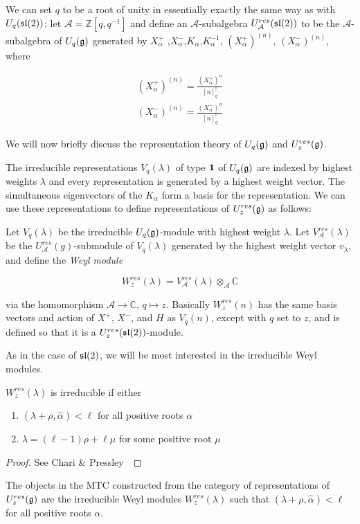 We can set $q$ to be a root of unity in essentially exactly the same way as
with $U_q(\mathfrak{sl}(2))$: let $\mathcal{A} = \mathbb{Z}[q,q^{-1}]$ and define an 
$\mathcal{A}$-subalgebra $U_\mathcal{A}^{res}(\mathfrak{sl}(2))$ to be the
$\mathcal{A}$-subalgebra of $U_q(\mathfrak{g})$ generated by $ X_\alpha^+$
,$X_\alpha^-$,$K_\alpha$,$K_\alpha^{-1}$, $(X_\alpha^+) ^{(n)}$,
$(X_\alpha^-)^{(n)}$, where


\begin{align}
     (X_\alpha^+)^{(n)} = \frac{ (X_\alpha^+)^n}{[n]^!_{q}} \\
    (X_\alpha^-)^{(n)} = \frac{(X_\alpha^-)^n}{[n]^!_{q}} 
\end{align}


We will now briefly discuss the representation theory of $U_q(\mathfrak{g})$ and $U_z^{res}(\mathfrak{g})$.

The irreducible representations $V_q(\lambda)$ of type $\mathbf{1}$ of
$U_q(\mathfrak{g})$ are indexed by highest weights $\lambda$ and every representation
is generated by a highest weight vector. The simultaneous eigenvectors of the
$K_\alpha$ form a basis for the representation. We can use these
representations to define representations of $U_z^{res}(\mathfrak{g})$ as follows:

Let $V_q(\lambda)$ be the irreducible $U_q(\mathfrak{g})$-module with highest weight
$\lambda$. Let $V_\mathcal{A}^{res}(\lambda)$ be the
$U_\mathcal{A}^{res}(g)$-submodule of $V_q(\lambda)$ generated by the highest
weight vector $v_\lambda$, and define the \emph{Weyl module}

\begin{equation}
    W_z^{res}(\lambda) = V_\mathcal{A}^{res}(\lambda) \otimes_\mathcal{A} \mathbb{C}
\end{equation}

via the homomorphism $\mathcal{A} \to \mathbb{C}$, $q \mapsto z$. Basically
$W_z^{res}(n)$ has the same basis vectors and action of $X^+$, $X^-$, and $H$
as $V_q(n)$, except with $q$ set to $z$, and is defined so that it is a
$U_z^{res}(\mathfrak{sl}(2))$-module.

As in the case of $\mathfrak{sl}(2)$, we will be most interested in the irreducible Weyl
modules. 

\begin{claim}
    $W_z^{res}(\lambda)$ is irreducible if either 
    \begin{enumerate}
        \item $(\lambda + \rho, \hat{\alpha}) < \ell$ for all positive
            roots $\alpha$
        \item $\lambda = (\ell - 1) \rho + \ell \mu$ for some positive root $\mu$
    \end{enumerate}
\end{claim}
\begin{proof}
See Chari \& Pressley~\cite{CP}
\end{proof}

The objects in the MTC constructed from the category of representations of
$U_z^{res}(\mathfrak{g})$ are the irreducible Weyl modules $W_z^{res}(\lambda)$ such
that $(\lambda + \rho, \hat{\alpha}) < \ell$ for all positive roots $\alpha$.
